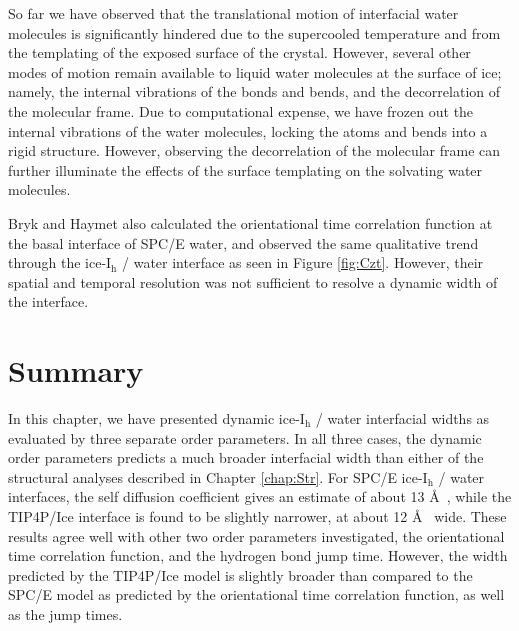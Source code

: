 So far we have observed that the translational motion of interfacial
water molecules is significantly hindered due to the supercooled
temperature and from the templating of the exposed surface of the
crystal. However, several other modes of motion remain available to
liquid water molecules at the surface of ice; namely, the internal
vibrations of the bonds and bends, and the decorrelation of the
molecular frame. Due to computational expense, we have frozen out the
internal vibrations of the water molecules, locking the atoms and
bends into a rigid structure. However, observing the decorrelation of
the molecular frame can further illuminate the effects of the surface
templating on the solvating water molecules.

Bryk and Haymet also calculated the orientational time correlation
function at the basal interface of SPC/E water,\cite{Bryk2002} and
observed the same qualitative trend through the ice-I$_\mathrm{h}$ /
water interface as seen in Figure \ref{fig:Czt}. However, their
spatial and temporal resolution was not sufficient to resolve a
dynamic width of the interface. 





\section{Summary}
In this chapter, we have presented dynamic ice-I$_\mathrm{h}$ / water
interfacial widths as evaluated by three separate order parameters. In
all three cases, the dynamic order parameters predicts a much broader
interfacial width than either of the structural analyses described in
Chapter \ref{chap:Str}.  For SPC/E ice-I$_\mathrm{h}$ / water
interfaces, the self diffusion coefficient gives an estimate of about
13 \AA~, while the TIP4P/Ice interface is found to be slightly
narrower, at about  12 \AA~ wide. These
results agree well with other two order parameters investigated, the
orientational time correlation function, and the hydrogen bond jump
time. However, the width predicted by the TIP4P/Ice model
is slightly broader than compared to the SPC/E model as predicted by
the orientational time correlation function, as well as the jump times.
